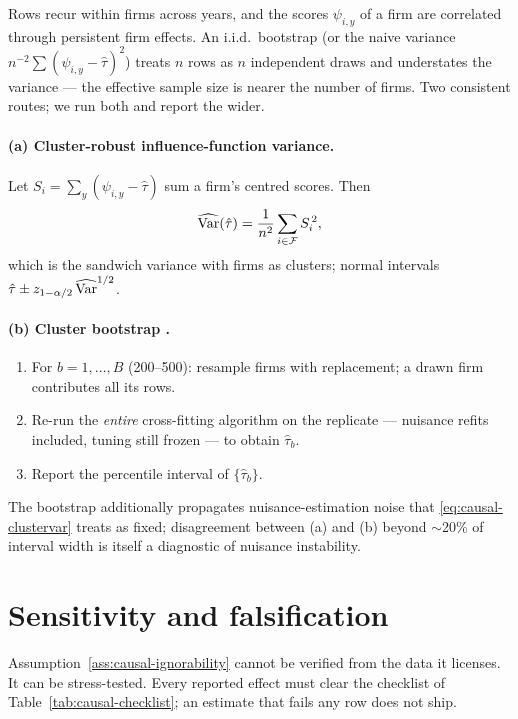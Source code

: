 Rows recur within firms across years, and the scores $\psi_{i,y}$ of a firm are
correlated through persistent firm effects. An i.i.d.\ bootstrap (or the naive variance
$n^{-2}\sum(\psi_{i,y} - \hat\tau)^2$) treats $n$ rows as $n$ independent draws and
understates the variance --- the effective sample size is nearer the number of firms.
Two consistent routes; we run both and report the wider.

\paragraph{(a) Cluster-robust influence-function variance.}
Let $S_i = \sum_{y} (\psi_{i,y} - \hat\tau)$ sum a firm's centred scores. Then
\begin{equation}
\widehat{\mathrm{Var}}(\hat\tau) = \frac{1}{n^2} \sum_{i \in \mathcal{F}} S_i^{\,2},
\label{eq:causal-clustervar}
\end{equation}
which is the sandwich variance with firms as clusters; normal intervals
$\hat\tau \pm z_{1-\alpha/2}\,\widehat{\mathrm{Var}}^{1/2}$.

\paragraph{(b) Cluster bootstrap \cite{efron1994}.}
\begin{enumerate}
\item For $b = 1, \dots, B$ (200--500): resample firms with replacement; a drawn firm
contributes all its rows.
\item Re-run the \emph{entire} cross-fitting algorithm on the replicate --- nuisance
refits included, tuning still frozen --- to obtain $\hat\tau_b$.
\item Report the percentile interval of $\{\hat\tau_b\}$.
\end{enumerate}
The bootstrap additionally propagates nuisance-estimation noise that
\eqref{eq:causal-clustervar} treats as fixed; disagreement between (a) and (b) beyond
$\sim$20\% of interval width is itself a diagnostic of nuisance instability.

\section{Sensitivity and falsification}
\label{sec:causal-sens}

Assumption~\ref{ass:causal-ignorability} cannot be verified from the data it licenses.
It can be stress-tested. Every reported effect must clear the checklist of
Table~\ref{tab:causal-checklist}; an estimate that fails any row does not ship.

